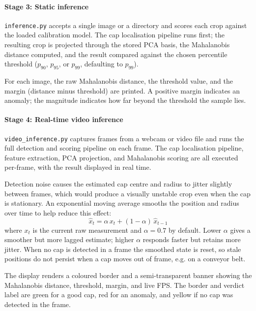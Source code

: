 \documentclass[conference]{IEEEtran}
\begin{document}
\paragraph{Stage 3: Static inference}
\texttt{inference.py} accepts a single image or a directory and scores each crop against the loaded calibration model. The cap localisation pipeline runs first; the resulting crop is projected through the stored PCA basis, the Mahalanobis distance computed, and the result compared against the chosen percentile threshold ($p_{90}$, $p_{95}$, or $p_{99}$, defaulting to $p_{99}$).

For each image, the raw Mahalanobis distance, the threshold value, and the margin (distance minus threshold) are printed. A positive margin indicates an anomaly; the magnitude indicates how far beyond the threshold the sample lies.

\paragraph{Stage 4: Real-time video inference}
\texttt{video\_inference.py} captures frames from a webcam or video file and runs the full detection and scoring pipeline on each frame. The cap localisation pipeline, feature extraction, PCA projection, and Mahalanobis scoring are all executed per-frame, with the result displayed in real time.

Detection noise causes the estimated cap centre and radius to jitter slightly between frames, which would produce a visually unstable crop even when the cap is stationary. An exponential moving average smooths the position and radius over time to help reduce this effect:
\begin{equation}
    \hat{x}_t = \alpha\, x_t + (1-\alpha)\, \hat{x}_{t-1}
\end{equation}
where $x_t$ is the current raw measurement and $\alpha=0.7$ by default. Lower $\alpha$ gives a smoother but more lagged estimate; higher $\alpha$ responds faster but retains more jitter. When no cap is detected in a frame the smoothed state is reset, so stale positions do not persist when a cap moves out of frame, e.g. on a conveyor belt.

The display renders a coloured border and a semi-transparent banner showing the Mahalanobis distance, threshold, margin, and live FPS. The border and verdict label are green for a good cap, red for an anomaly, and yellow if no cap was detected in the frame.

\end{document}
